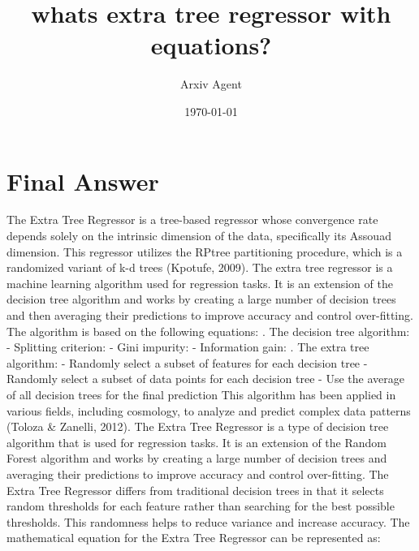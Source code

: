 \documentclass{article}%
\title{whats extra tree regressor with equations?}%
\author{Arxiv Agent}%
\date{\today}%
\begin{document}
%
\normalsize%
\maketitle%
\section{Final Answer}%
\label{sec:FinalAnswer}%
The Extra Tree Regressor is a tree{-}based regressor whose convergence rate depends solely on the intrinsic dimension of the data, specifically its Assouad dimension. This regressor utilizes the RPtree partitioning procedure, which is a randomized variant of k{-}d trees (Kpotufe, 2009). The extra tree regressor is a machine learning algorithm used for regression tasks. It is an extension of the decision tree algorithm and works by creating a large number of decision trees and then averaging their predictions to improve accuracy and control over{-}fitting. The algorithm is based on the following equations: \newline%
. The decision tree algorithm:\newline%
   {-} Splitting criterion: \newline%
     {-} Gini impurity: \newline%
     {-} Information gain: \newline%
. The extra tree algorithm:\newline%
   {-} Randomly select a subset of features for each decision tree\newline%
   {-} Randomly select a subset of data points for each decision tree\newline%
   {-} Use the average of all decision trees for the final prediction\newline%
\newline%
This algorithm has been applied in various fields, including cosmology, to analyze and predict complex data patterns (Toloza \& Zanelli, 2012). The Extra Tree Regressor is a type of decision tree algorithm that is used for regression tasks. It is an extension of the Random Forest algorithm and works by creating a large number of decision trees and averaging their predictions to improve accuracy and control over{-}fitting. The Extra Tree Regressor differs from traditional decision trees in that it selects random thresholds for each feature rather than searching for the best possible thresholds. This randomness helps to reduce variance and increase accuracy. The mathematical equation for the Extra Tree Regressor can be represented as:\newline%
\end{document}
